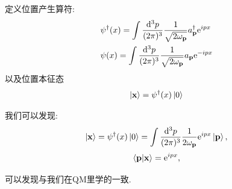 \begin{definition}[位置本征态]
    定义位置产生算符:
    \begin{align}
        &\psi^\dagger(x)=\int\ldsq pa^\dagger_{\vec p}\mathrm e^{ipx}\\
        &\psi(x)=\int\ldsq pa_{\vec p}\mathrm e^{-ipx}
    \end{align}
    以及位置本征态
    \begin{equation}
        \ket{\mathbf{x}}=\psi^\dagger(x)\ket0
    \end{equation}
\end{definition}
我们可以发现:
\begin{equation}
    \ket{\vec x}=\psi^\dagger(x)\ket0=\int\ld{p}\exp{ipx}\ket{\vec p},
\end{equation}
\begin{equation}
    \braket{\mathbf{p}|\mathbf{x}}=\mathrm e^{ipx},
\end{equation}

可以发现与我们在QM里学的一致.

